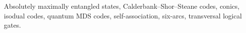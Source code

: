 Absolutely maximally entangled states, Calderbank--Shor--Steane codes,
conics, isodual codes, quantum MDS codes, self-association, six-arcs,
transversal logical gates.
